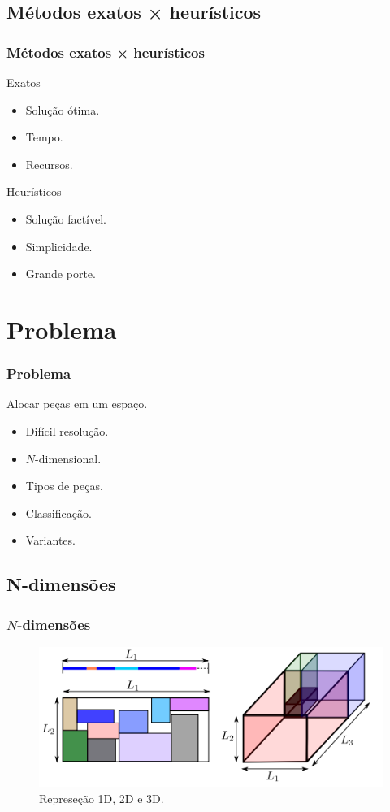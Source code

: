 \documentclass[12pt]{beamer}
\begin{document}
    \subsection{Métodos exatos × heurísticos}\label{subsec:metodos-exatos-heuristicos}
    \begin{frame}
        \frametitle{Métodos exatos × heurísticos}
        Exatos
        \begin{itemize}
            \item Solução ótima.
            \item Tempo.
            \item Recursos.
        \end{itemize}
        Heurísticos
        \begin{itemize}
            \item Solução factível.
            \item Simplicidade.
            \item Grande porte.
        \end{itemize}
    \end{frame}


    \section{Problema}\label{sec:problema}
    \begin{frame}
        \frametitle{Problema}
        Alocar peças em um espaço.
        \begin{itemize}
            \item Difícil resolução.
            \item $N$-dimensional.
            \item Tipos de peças.
            \item Classificação.
            \item Variantes.
        \end{itemize}
    \end{frame}

    \subsection{N-dimensões}\label{subsec:n-dimensoes}
    \begin{frame}
        \frametitle{$N$-dimensões}
        \begin{figure}[!htb]
            \centering
            \includegraphics[scale=0.6]{utils/images/packing-example}
            \caption{Represeção 1D, 2D e 3D.}
            \label{fig:packing}
        \end{figure}
    \end{frame}
\end{document}
